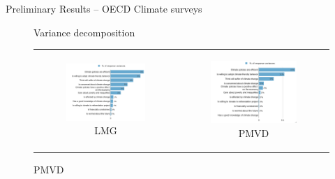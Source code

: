 \documentclass{article}
\begin{document}
\begin{LARGE}
	\begin{center}
		Preliminary Results – OECD Climate surveys	
	\end{center}
	
\end{LARGE}
	\tableofcontents
	\listoffigures

\clearpage


\begin{figure}[h!]
\begin{center}
	\caption{Variance decomposition}
	\caption*{Index Ban on Combustion-Engine Cars}
	\setlength\extrarowheight{-1pt}
	\begin{tabular}{cc}
		\begin{subfigure}{0.5\textwidth}
		\caption{LMG}
			\includegraphics[width=\textwidth]{lmg_standard_non_standardized}
		\end{subfigure}&
		\begin{subfigure}{0.5\textwidth}
		\caption{PMVD}
			\includegraphics[width=\textwidth]{pmvd_standard_non_standardized}
		\end{subfigure}\\
	\end{tabular}


\end{center}
\end{figure}
\end{document}

